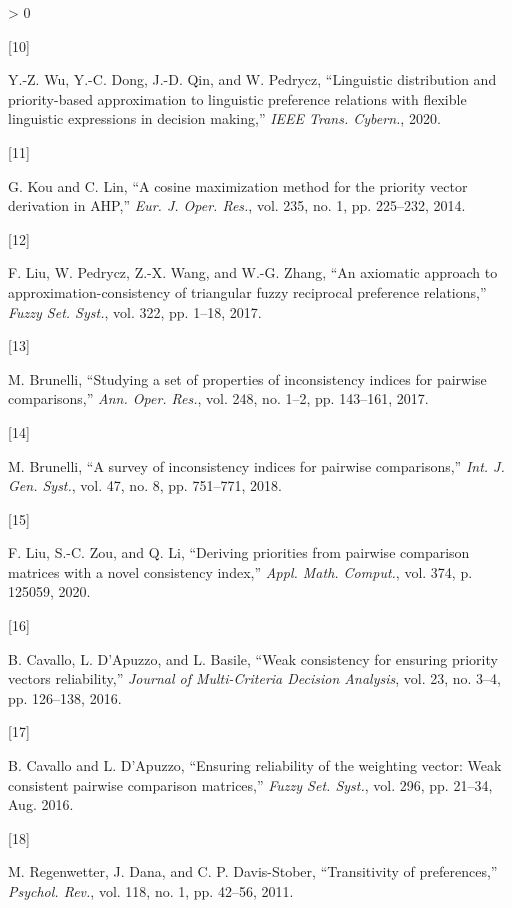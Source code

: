 \documentclass[
]{article}
\newlength{\cslhangindent}
\newlength{\csllabelwidth}
\newenvironment{CSLReferences}[2] %
 {%
  \setlength{\parindent}{0pt}
  \ifodd #1 \everypar{\setlength{\hangindent}{\cslhangindent}}\ignorespaces\fi
  \ifnum #2 > 0
  \setlength{\parskip}{#2\baselineskip}
  \fi
 }%
 {}
\newcommand{\CSLLeftMargin}[1]{\parbox[t]{\csllabelwidth}{#1}}
\newcommand{\CSLRightInline}[1]{\parbox[t]{\linewidth - \csllabelwidth}{#1}\break}
\begin{document}
\begin{CSLReferences}{0}{0}
\leavevmode\hypertarget{ref-WuYZ2020}{}%
\CSLLeftMargin{{[}10{]} }
\CSLRightInline{Y.-Z. Wu, Y.-C. Dong, J.-D. Qin, and W. Pedrycz,
{``Linguistic distribution and priority-based approximation to
linguistic preference relations with flexible linguistic expressions in
decision making,''} \emph{IEEE Trans. Cybern.}, 2020.}

\leavevmode\hypertarget{ref-kou2014cosine}{}%
\CSLLeftMargin{{[}11{]} }
\CSLRightInline{G. Kou and C. Lin, {``A cosine maximization method for
the priority vector derivation in {AHP},''} \emph{Eur. J. Oper. Res.},
vol. 235, no. 1, pp. 225--232, 2014.}

\leavevmode\hypertarget{ref-liu2017axiomatic}{}%
\CSLLeftMargin{{[}12{]} }
\CSLRightInline{F. Liu, W. Pedrycz, Z.-X. Wang, and W.-G. Zhang, {``An
axiomatic approach to approximation-consistency of triangular fuzzy
reciprocal preference relations,''} \emph{Fuzzy Set. Syst.}, vol. 322,
pp. 1--18, 2017.}

\leavevmode\hypertarget{ref-brunelli2017studying}{}%
\CSLLeftMargin{{[}13{]} }
\CSLRightInline{M. Brunelli, {``Studying a set of properties of
inconsistency indices for pairwise comparisons,''} \emph{Ann. Oper.
Res.}, vol. 248, no. 1--2, pp. 143--161, 2017.}

\leavevmode\hypertarget{ref-brunelli2018survey}{}%
\CSLLeftMargin{{[}14{]} }
\CSLRightInline{M. Brunelli, {``A survey of inconsistency indices for
pairwise comparisons,''} \emph{Int. J. Gen. Syst.}, vol. 47, no. 8, pp.
751--771, 2018.}

\leavevmode\hypertarget{ref-liu2020deriving}{}%
\CSLLeftMargin{{[}15{]} }
\CSLRightInline{F. Liu, S.-C. Zou, and Q. Li, {``Deriving priorities
from pairwise comparison matrices with a novel consistency index,''}
\emph{Appl. Math. Comput.}, vol. 374, p. 125059, 2020.}

\leavevmode\hypertarget{ref-cavallo2016weak}{}%
\CSLLeftMargin{{[}16{]} }
\CSLRightInline{B. Cavallo, L. D'Apuzzo, and L. Basile, {``Weak
consistency for ensuring priority vectors reliability,''} \emph{Journal
of Multi-Criteria Decision Analysis}, vol. 23, no. 3--4, pp. 126--138,
2016.}

\leavevmode\hypertarget{ref-cavallo2016ensuring}{}%
\CSLLeftMargin{{[}17{]} }
\CSLRightInline{B. Cavallo and L. D'Apuzzo, {``Ensuring reliability of
the weighting vector: {Weak} consistent pairwise comparison matrices,''}
\emph{Fuzzy Set. Syst.}, vol. 296, pp. 21--34, Aug. 2016.}

\leavevmode\hypertarget{ref-regenwetter2011transitivity}{}%
\CSLLeftMargin{{[}18{]} }
\CSLRightInline{M. Regenwetter, J. Dana, and C. P. Davis-Stober,
{``Transitivity of preferences,''} \emph{Psychol. Rev.}, vol. 118, no.
1, pp. 42--56, 2011.}


\end{CSLReferences}
\end{document}
